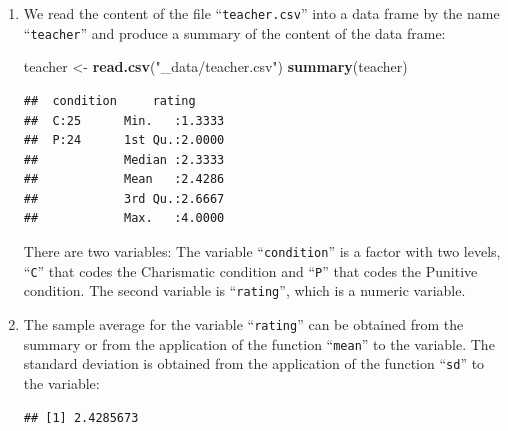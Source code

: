\documentclass[]{krantz}
\makeatletter
\newenvironment{Shaded}{\begin{snugshade}}{\end{snugshade}}
\newcommand{\KeywordTok}[1]{\textcolor[rgb]{0.13,0.29,0.53}{\textbf{#1}}}
\newcommand{\NormalTok}[1]{#1}
\newcommand{\OperatorTok}[1]{\textcolor[rgb]{0.81,0.36,0.00}{\textbf{#1}}}
\newcommand{\StringTok}[1]{\textcolor[rgb]{0.31,0.60,0.02}{#1}}
\newenvironment{kframe}{%
\medskip{}
\setlength{\fboxsep}{.8em}
 \def\at@end@of@kframe{}%
 \ifinner\ifhmode%
  \def\at@end@of@kframe{\end{minipage}}%
  \begin{minipage}{\columnwidth}%
 \fi\fi%
 \def\FrameCommand##1{\hskip\@totalleftmargin \hskip-\fboxsep
 \colorbox{shadecolor}{##1}\hskip-\fboxsep
     \hskip-\linewidth \hskip-\@totalleftmargin \hskip\columnwidth}%
 \MakeFramed {\advance\hsize-\width
   \@totalleftmargin\z@ \linewidth\hsize
   \@setminipage}}%
 {\par\unskip\endMakeFramed%
 \at@end@of@kframe}
\renewenvironment{Shaded}{\begin{kframe}}{\end{kframe}}
\theoremstyle{definition}
\theoremstyle{definition}
\theoremstyle{definition}
\theoremstyle{remark}
\makeatother
\begin{document}
\begin{enumerate}
\def\labelenumi{\arabic{enumi}.}
\item
  We read the content of the file
  ``\texttt{teacher.csv}'' into a data frame by the name ``\texttt{teacher}'' and produce a
  summary of the content of the data frame:

\begin{Shaded}
\begin{Highlighting}[]
\NormalTok{teacher <-}\StringTok{ }\KeywordTok{read.csv}\NormalTok{(}\StringTok{"_data/teacher.csv"}\NormalTok{)}
\KeywordTok{summary}\NormalTok{(teacher)}
\end{Highlighting}
\end{Shaded}

\begin{verbatim}
##  condition     rating      
##  C:25      Min.   :1.3333  
##  P:24      1st Qu.:2.0000  
##            Median :2.3333  
##            Mean   :2.4286  
##            3rd Qu.:2.6667  
##            Max.   :4.0000
\end{verbatim}

  There are two variables: The variable ``\texttt{condition}'' is a factor with two
  levels, ``\texttt{C}'' that codes the Charismatic condition and ``\texttt{P}'' that codes
  the Punitive condition. The second variable is ``\texttt{rating}'', which is a
  numeric variable.
\item
  The sample average for the
  variable ``\texttt{rating}'' can be obtained from the summary or from the
  application of the function ``\texttt{mean}'' to the variable. The standard
  deviation is obtained from the application of the function ``\texttt{sd}'' to the
  variable:

\begin{Shaded}
\end{Shaded}

\begin{verbatim}
## [1] 2.4285673
\end{verbatim}

\begin{Shaded}
\end{Shaded}


\end{enumerate}
\end{document}
